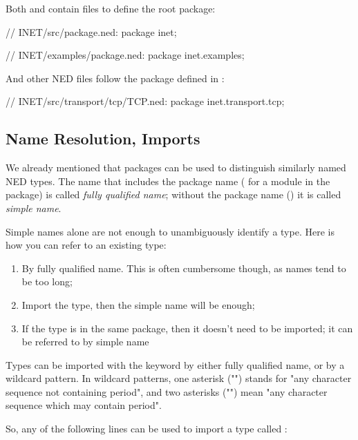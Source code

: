 Both  and  contain  files to
define the root package:

\begin{ned}
// INET/src/package.ned:
package inet;
\end{ned}

\begin{ned}
// INET/examples/package.ned:
package inet.examples;
\end{ned}

And other NED files follow the package defined in :

\begin{ned}
// INET/src/transport/tcp/TCP.ned:
package inet.transport.tcp;
\end{ned}


\subsection{Name Resolution, Imports}
\label{sec:ned-lang:imports-and-name-resolution}

We already mentioned that packages can be used to distinguish
similarly named NED types. The name that includes the package name
( for a  module in the 
package) is called \textit{fully qualified name}; without the package
name () it is called \textit{simple name}.

Simple names alone are not enough to unambiguously identify a type.
Here is how you can refer to an existing type:

\begin{enumerate}
  \item By fully qualified name. This is often cumbersome though,
        as names tend to be too long;
  \item Import the type, then the simple name will be enough;
  \item If the type is in the same package, then it doesn't need to be
        imported; it can be referred to by simple name
\end{enumerate}

Types can be imported with the  keyword by either
fully qualified name, or by a wildcard pattern. In wildcard patterns,
one asterisk ("\ttt{*}") stands for "any character sequence not containing
period", and two asterisks ("\ttt{**}") mean "any character sequence which may
contain period".

So, any of the following lines can be used to import a type called
:

